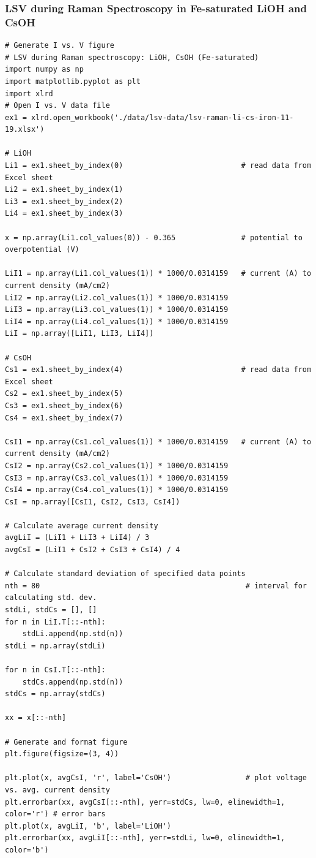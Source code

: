 \documentclass[journal=jpccck,manuscript=suppinfo,email=true]{achemso}
\begin{document}
\subsubsection{LSV during Raman Spectroscopy in Fe-saturated LiOH and CsOH}
\label{sec-6-1-8}
\begin{verbatim}
# Generate I vs. V figure
# LSV during Raman spectroscopy: LiOH, CsOH (Fe-saturated)
import numpy as np
import matplotlib.pyplot as plt
import xlrd
# Open I vs. V data file
ex1 = xlrd.open_workbook('./data/lsv-data/lsv-raman-li-cs-iron-11-19.xlsx')

# LiOH
Li1 = ex1.sheet_by_index(0)                           # read data from Excel sheet
Li2 = ex1.sheet_by_index(1)
Li3 = ex1.sheet_by_index(2)
Li4 = ex1.sheet_by_index(3)

x = np.array(Li1.col_values(0)) - 0.365               # potential to overpotential (V)

LiI1 = np.array(Li1.col_values(1)) * 1000/0.0314159   # current (A) to current density (mA/cm2)
LiI2 = np.array(Li2.col_values(1)) * 1000/0.0314159
LiI3 = np.array(Li3.col_values(1)) * 1000/0.0314159
LiI4 = np.array(Li4.col_values(1)) * 1000/0.0314159
LiI = np.array([LiI1, LiI3, LiI4])

# CsOH
Cs1 = ex1.sheet_by_index(4)                           # read data from Excel sheet
Cs2 = ex1.sheet_by_index(5)
Cs3 = ex1.sheet_by_index(6)
Cs4 = ex1.sheet_by_index(7)

CsI1 = np.array(Cs1.col_values(1)) * 1000/0.0314159   # current (A) to current density (mA/cm2)
CsI2 = np.array(Cs2.col_values(1)) * 1000/0.0314159
CsI3 = np.array(Cs3.col_values(1)) * 1000/0.0314159
CsI4 = np.array(Cs4.col_values(1)) * 1000/0.0314159
CsI = np.array([CsI1, CsI2, CsI3, CsI4])

# Calculate average current density
avgLiI = (LiI1 + LiI3 + LiI4) / 3
avgCsI = (LiI1 + CsI2 + CsI3 + CsI4) / 4

# Calculate standard deviation of specified data points
nth = 80                                               # interval for calculating std. dev.
stdLi, stdCs = [], []
for n in LiI.T[::-nth]:
    stdLi.append(np.std(n))
stdLi = np.array(stdLi)

for n in CsI.T[::-nth]:
    stdCs.append(np.std(n))
stdCs = np.array(stdCs)

xx = x[::-nth]

# Generate and format figure
plt.figure(figsize=(3, 4))

plt.plot(x, avgCsI, 'r', label='CsOH')                 # plot voltage vs. avg. current density
plt.errorbar(xx, avgCsI[::-nth], yerr=stdCs, lw=0, elinewidth=1, color='r') # error bars
plt.plot(x, avgLiI, 'b', label='LiOH')
plt.errorbar(xx, avgLiI[::-nth], yerr=stdLi, lw=0, elinewidth=1, color='b')


\end{verbatim}
\end{document}
